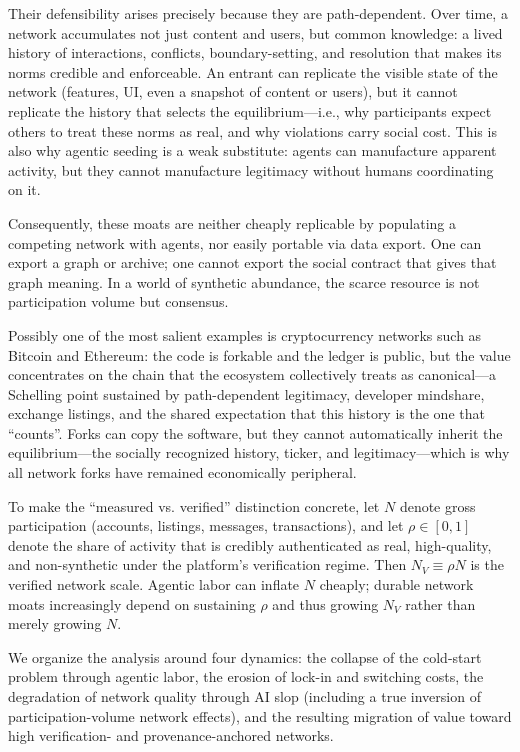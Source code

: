 \documentclass[12pt, letter]{article}
\begin{document}
\begin{itemize}
    Their defensibility arises precisely because they are path-dependent. Over time, a network accumulates not just content and users, but common knowledge: a lived history of interactions, conflicts, boundary-setting, and resolution that makes its norms credible and enforceable. An entrant can replicate the visible state of the network (features, UI, even a snapshot of content or users), but it cannot replicate the history that selects the equilibrium---i.e., why participants expect others to treat these norms as real, and why violations carry social cost. This is also why agentic seeding is a weak substitute: agents can manufacture apparent activity, but they cannot manufacture legitimacy without humans coordinating on it.  
    
    Consequently, these moats are neither cheaply replicable by populating a competing network with agents, nor easily portable via data export. One can export a graph or archive; one cannot export the social contract that gives that graph meaning. In a world of synthetic abundance, the scarce resource is not participation volume but consensus.  
    
    Possibly one of the most salient examples is cryptocurrency networks such as Bitcoin and Ethereum: the code is forkable and the ledger is public, but the value concentrates on the chain that the ecosystem collectively treats as canonical---a Schelling point sustained by path-dependent legitimacy, developer mindshare, exchange listings, and the shared expectation that this history is the one that ``counts''. Forks can copy the software, but they cannot automatically inherit the equilibrium---the socially recognized history, ticker, and legitimacy---which is why all network forks have remained economically peripheral.     

\end{itemize}

To make the ``measured vs. verified'' distinction concrete, let $N$ denote gross participation (accounts, listings, messages, transactions), and let $\rho \in [0,1]$ denote the share of activity that is credibly authenticated as real, high-quality, and non-synthetic under the platform's verification regime. Then $N_V \equiv \rho N$ is the verified network scale. Agentic labor can inflate $N$ cheaply; durable network moats increasingly depend on sustaining $\rho$ and thus growing $N_V$ rather than merely growing $N$.

We organize the analysis around four dynamics: the collapse of the cold-start problem through agentic labor, the erosion of lock-in and switching costs, the degradation of network quality through AI slop (including a true inversion of participation-volume network effects), and the resulting migration of value toward high verification- and provenance-anchored networks.
\end{document}
